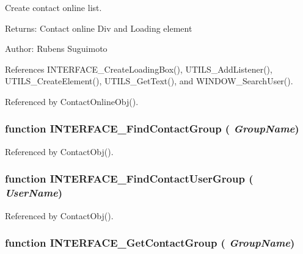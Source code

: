 Create contact online list. 

\begin{Desc}
\item[Returns:]Contact online Div and Loading element \end{Desc}
\begin{Desc}
\item[Author:]Rubens Suguimoto \end{Desc}


References INTERFACE\_\-CreateLoadingBox(), UTILS\_\-AddListener(), UTILS\_\-CreateElement(), UTILS\_\-GetText(), and WINDOW\_\-SearchUser().

Referenced by ContactOnlineObj().
\subsubsection[INTERFACE\_\-FindContactGroup]{\setlength{\rightskip}{0pt plus 5cm}function INTERFACE\_\-FindContactGroup ( {\em GroupName})}\label{interface_2contact_8js_8bd72a027bb280b431364761ded00557}




Referenced by ContactObj().
\subsubsection[INTERFACE\_\-FindContactUserGroup]{\setlength{\rightskip}{0pt plus 5cm}function INTERFACE\_\-FindContactUserGroup ( {\em UserName})}\label{interface_2contact_8js_99f836bd411fff8de8b729a674b731c4}




Referenced by ContactObj().
\subsubsection[INTERFACE\_\-GetContactGroup]{\setlength{\rightskip}{0pt plus 5cm}function INTERFACE\_\-GetContactGroup ( {\em GroupName})}\label{interface_2contact_8js_aeea57571d9c593b9f92f20165ffb329}




